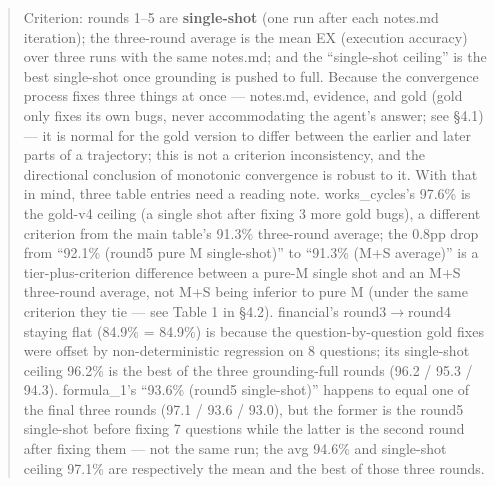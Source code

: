 \documentclass[11pt]{article}
\begin{document}
\begin{quote}
Criterion: rounds 1--5 are \textbf{single-shot} (one run after each notes.md iteration); the three-round average is the mean EX (execution accuracy) over three runs with the same notes.md; and the ``single-shot ceiling'' is the best single-shot once grounding is pushed to full. Because the convergence process fixes three things at once --- notes.md, evidence, and gold (gold only fixes its own bugs, never accommodating the agent's answer; see \S{}4.1) --- it is normal for the gold version to differ between the earlier and later parts of a trajectory; this is not a criterion inconsistency, and the directional conclusion of monotonic convergence is robust to it. With that in mind, three table entries need a reading note. works\_cycles's 97.6\% is the gold-v4 ceiling (a single shot after fixing 3 more gold bugs), a different criterion from the main table's 91.3\% three-round average; the 0.8pp drop from ``92.1\% (round5 pure M single-shot)'' to ``91.3\% (M+S average)'' is a tier-plus-criterion difference between a pure-M single shot and an M+S three-round average, not M+S being inferior to pure M (under the same criterion they tie --- see Table 1 in \S{}4.2). financial's round3$\rightarrow$round4 staying flat (84.9\% = 84.9\%) is because the question-by-question gold fixes were offset by non-deterministic regression on 8 questions; its single-shot ceiling 96.2\% is the best of the three grounding-full rounds (96.2 / 95.3 / 94.3). formula\_1's ``93.6\% (round5 single-shot)'' happens to equal one of the final three rounds (97.1 / 93.6 / 93.0), but the former is the round5 single-shot before fixing 7 questions while the latter is the second round after fixing them --- not the same run; the avg 94.6\% and single-shot ceiling 97.1\% are respectively the mean and the best of those three rounds.
\end{quote}
\end{document}
